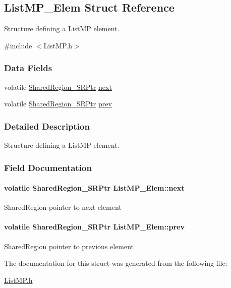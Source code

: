 \subsection{List\-M\-P\-\_\-\-Elem Struct Reference}
\label{struct_list_m_p___elem}


Structure defining a List\-M\-P element.  




{\ttfamily \#include $<$List\-M\-P.\-h$>$}

\subsubsection*{Data Fields}
\begin{DoxyCompactItemize}
\item 
volatile \hyperlink{_shared_region_8h_a3efe06da0fa1fcbb3b271278ddd9b410}{Shared\-Region\-\_\-\-S\-R\-Ptr} \hyperlink{struct_list_m_p___elem_a8412a4ab0e165caa517a2b6b36ee718a}{next}
\item 
volatile \hyperlink{_shared_region_8h_a3efe06da0fa1fcbb3b271278ddd9b410}{Shared\-Region\-\_\-\-S\-R\-Ptr} \hyperlink{struct_list_m_p___elem_af77ecd85f8df18db6bfcbbd55dcc99ab}{prev}
\end{DoxyCompactItemize}


\subsubsection{Detailed Description}
Structure defining a List\-M\-P element. 

\subsubsection{Field Documentation}
\paragraph[{next}]{\setlength{\rightskip}{0pt plus 5cm}volatile {\bf Shared\-Region\-\_\-\-S\-R\-Ptr} List\-M\-P\-\_\-\-Elem\-::next}\label{struct_list_m_p___elem_a8412a4ab0e165caa517a2b6b36ee718a}
Shared\-Region pointer to next element 
\paragraph[{prev}]{\setlength{\rightskip}{0pt plus 5cm}volatile {\bf Shared\-Region\-\_\-\-S\-R\-Ptr} List\-M\-P\-\_\-\-Elem\-::prev}\label{struct_list_m_p___elem_af77ecd85f8df18db6bfcbbd55dcc99ab}
Shared\-Region pointer to previous element 

The documentation for this struct was generated from the following file\-:\begin{DoxyCompactItemize}
\item 
\hyperlink{_list_m_p_8h}{List\-M\-P.\-h}\end{DoxyCompactItemize}
